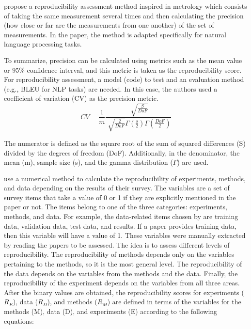 \documentclass[12pt, a4paper, twocolumn]{article}
\begin{document}
			\citet{belz2022quantified} propose a reproducibility assessment method inspired in metrology which consists of taking the same measurement several times and then calculating the precision (how close or far are the measurements from one another) of the set of measurements. In the paper, the method is adapted specifically for natural language processing tasks.

			To summarize, precision can be calculated using metrics such as the mean value or 95\% confidence interval, and this metric is taken as the reproducibility score. For reproducibility assessment, a model (code) to test and an evaluation method (e.g., BLEU for NLP tasks) are needed. In this case, the authors used a coefficient of variation (CV) as the precision metric.
			\begin{equation}\label{cv}
				CV = \frac{1}{m} \frac{\sqrt[]{\frac{S}{DoF}}}{\sqrt[]{\frac{2}{DoF}} \Gamma(\frac{s}{2})  \Gamma(\frac{DoF}{2}) }
			\end{equation}


			\noindent The numerator is defined as the square root of the sum of squared differences (S) divided by the degrees of freedom (DoF). Additionally, in the denominator, the mean (m), sample size (s), and the gamma distribution ($\Gamma$) are used.


			\citet{gundersen2018state} use a numerical method to calculate the reproducibility of experiments, methods, and data depending on the results of their survey. The variables are a set of survey items that take a value of 0 or 1 if they are explicitly mentioned in the paper or not. The items belong to one of the three categories: experiments, methods, and data. For example, the data-related items chosen by \citet{gundersen2018state} are training data,  validation data, test data, and results. If a paper provides training data, then this variable will have a value of 1. These variables were manually extracted by reading the papers to be assessed. The idea is to assess different levels of reproducibility. The reproducibility of methods depends only on the variables pertaining to the methods, so it is the most general level. The reproducibility of the data depends on the variables from the methods and the data. Finally, the reproducibility of the experiment depends on the variables from all three areas. After the binary values are obtained, the reproducibility scores for experiments ($R_{E}$), data ($R_{D}$), and methods ($R_{M}$) are defined in terms of the variables for the methods (M), data (D), and experiments (E) according to the following equations:
\end{document}
